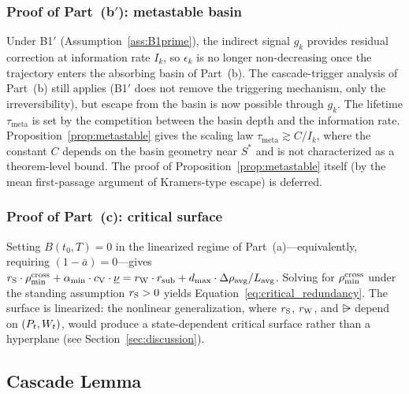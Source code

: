 \subsubsection*{Proof of Part~(b$'$): metastable basin}

Under B1$'$ (Assumption~\ref{ass:B1prime}), the indirect signal $g_k$
provides residual correction at information rate $I_k$, so
$\epsilon_k$ is no longer non-decreasing once the trajectory enters
the absorbing basin of Part~(b).  The cascade-trigger analysis of
Part~(b) still applies (B1$'$ does not remove the triggering
mechanism, only the irreversibility), but escape from the basin is
now possible through $g_k$.  The lifetime $\tau_{\mathrm{meta}}$ is
set by the competition between the basin depth and the information
rate.  Proposition~\ref{prop:metastable} gives the scaling law
$\tau_{\mathrm{meta}} \gtrsim C/I_k$, where the constant $C$ depends
on the basin geometry near $S^*$ and is not characterized as a
theorem-level bound.  The proof of Proposition~\ref{prop:metastable}
itself (by the mean first-passage argument of Kramers-type escape)
is deferred.

\subsubsection*{Proof of Part~(c): critical surface}

Setting $B(t_0, T) = 0$ in the linearized regime of
Part~(a)---equivalently, requiring $(1 - \bar{a}) = 0$---gives
$r_{\mathrm{S}} \cdot \rho_{\min}^{\mathrm{cross}} + \alpha_{\min} \cdot c_{\mathrm{V}} \cdot
\underline{\nu} = r_{\mathrm{W}} \cdot r_{\mathrm{sub}} + d_{\mathrm{max}} \cdot
\Delta\rho_{\mathrm{avg}} / L_{\mathrm{avg}}$.  Solving for
$\rho_{\min}^{\mathrm{cross}}$ under the standing assumption $r_{\mathrm{S}} > 0$ yields
Equation~\ref{eq:critical_redundancy}.  The surface is linearized: the
nonlinear generalization, where $r_{\mathrm{S}}$, $r_{\mathrm{W}}$, and $\rsub$ depend on
$(P_t, W_t)$, would produce a state-dependent critical surface
rather than a hyperplane (see Section~\ref{sec:discussion}).

\subsection{Cascade Lemma}
\label{app:cascade}

